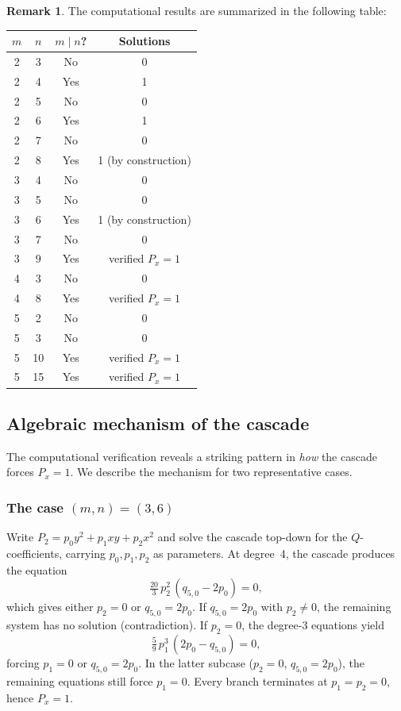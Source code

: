 \documentclass[12pt,a4paper]{article}
\theoremstyle{definition}
\newtheorem{remark}[theorem]{Remark}
\begin{document}
\begin{remark}
The computational results are summarized in the following table:

\medskip
\begin{center}
\begin{tabular}{cccc}
\hline
$m$ & $n$ & $m \mid n$? & Solutions \\
\hline
2 & 3 & No & 0 \\
2 & 4 & Yes & 1 \\
2 & 5 & No & 0 \\
2 & 6 & Yes & 1 \\
2 & 7 & No & 0 \\
2 & 8 & Yes & 1 (by construction) \\
3 & 4 & No & 0 \\
3 & 5 & No & 0 \\
3 & 6 & Yes & 1 (by construction) \\
3 & 7 & No & 0 \\
3 & 9 & Yes & verified $P_x = 1$ \\
4 & 3 & No & 0 \\
4 & 8 & Yes & verified $P_x = 1$ \\
5 & 2 & No & 0 \\
5 & 3 & No & 0 \\
5 & 10 & Yes & verified $P_x = 1$ \\
5 & 15 & Yes & verified $P_x = 1$ \\
\hline
\end{tabular}
\end{center}
\end{remark}

\subsection{Algebraic mechanism of the cascade}

The computational verification reveals a striking pattern in \emph{how} the
cascade forces $P_x = 1$. We describe the mechanism for two representative cases.

\subsubsection*{The case $(m,n) = (3,6)$}

Write $P_2 = p_0 y^2 + p_1 xy + p_2 x^2$ and solve the cascade top-down for the
$Q$-coefficients, carrying $p_0, p_1, p_2$ as parameters. At degree~4, the cascade
produces the equation
\[
  \tfrac{20}{3}\, p_2^2\, (q_{5,0} - 2p_0) = 0,
\]
which gives either $p_2 = 0$ or $q_{5,0} = 2p_0$. If $q_{5,0} = 2p_0$ with $p_2 \neq 0$,
the remaining system has no solution (contradiction). If $p_2 = 0$, the degree-3
equations yield
\[
  \tfrac{5}{9}\, p_1^3\, (2p_0 - q_{5,0}) = 0,
\]
forcing $p_1 = 0$ or $q_{5,0} = 2p_0$. In the latter subcase ($p_2 = 0$,
$q_{5,0} = 2p_0$), the remaining equations still force $p_1 = 0$. Every branch
terminates at $p_1 = p_2 = 0$, hence $P_x = 1$.
\end{document}
